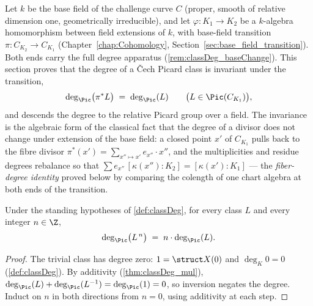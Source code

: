 Let \(k\) be the base field of the challenge curve \(C\) (proper, smooth of relative
dimension one, geometrically irreducible), and let \(\varphi : K_1 \to K_2\) be a
\(k\)-algebra homomorphism between field extensions of \(k\), with base-field transition
\(\pi : C_{K_2} \to C_{K_1}\)
(Chapter~\ref{chap:Cohomology}, Section~\ref{sec:base_field_transition}). Both ends carry
the full degree apparatus (\ref{rem:classDeg_baseChange}). This section proves that the
degree of a \v Cech Picard class is invariant under the transition,
\[
  \deg_{\Pic}\bigl(\pi^{*}L\bigr) \;=\; \deg_{\Pic}(L)
  \qquad \bigl(L \in \Pic(C_{K_1})\bigr),
\]
and descends the degree to the relative Picard group over a field. The invariance is the
algebraic form of the classical fact that the degree of a divisor does not change under
extension of the base field: a closed point \(x'\) of \(C_{K_1}\) pulls back to the fibre
divisor \(\pi^{*}(x') = \sum_{x'' \mapsto x'} e_{x''} \cdot x''\), and the multiplicities
and residue degrees rebalance so that
\(\sum e_{x''}\,[\kappa(x'') : K_2] = [\kappa(x') : K_1]\) --- the \emph{fiber-degree
identity} proved below by comparing the colength of one chart algebra at both ends of
the transition.

\begin{lemma}
  \label{lem:classDeg_zpow}
  \leanok
  Under the standing hypotheses of \ref{def:classDeg}, for every class \(L\) and every
  integer \(n \in \Z\),
  \[
    \deg_{\Pic}\bigl(L^{\,n}\bigr) \;=\; n \cdot \deg_{\Pic}(L).
  \]
\end{lemma}
\begin{proof}
  \leanok
  The trivial class has degree zero: \(1 = \struct X(0)\) and \(\deg_K 0 = 0\)
  (\ref{def:classDeg}). By additivity (\ref{thm:classDeg_mul}),
  \(\deg_{\Pic}(L) + \deg_{\Pic}(L^{-1}) = \deg_{\Pic}(1) = 0\), so inversion negates
  the degree. Induct on \(n\) in both directions from \(n = 0\), using additivity at
  each step.
\end{proof}

